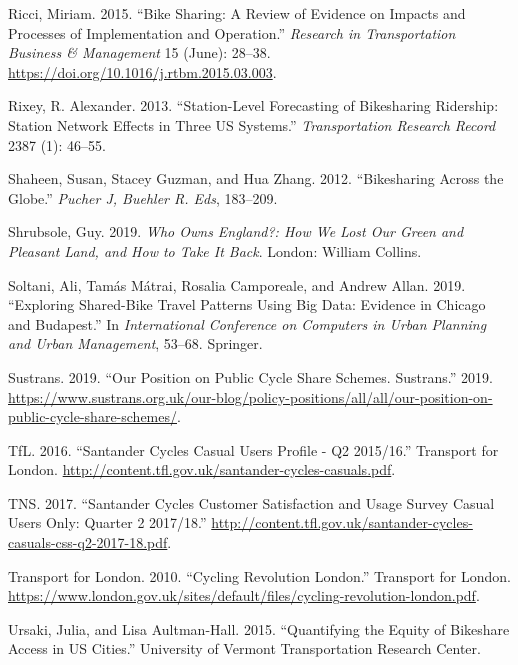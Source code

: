 \documentclass[
]{article}
\newlength{\cslhangindent}
\newenvironment{cslreferences}%
  {\setlength{\parindent}{0pt}%
  \everypar{\setlength{\hangindent}{\cslhangindent}}\ignorespaces}%
  {\par}
\begin{document}
\begin{cslreferences}
\leavevmode\hypertarget{ref-ricci_bike_2015}{}%
Ricci, Miriam. 2015. ``Bike Sharing: A Review of Evidence on Impacts and Processes of Implementation and Operation.'' \emph{Research in Transportation Business \& Management} 15 (June): 28--38. \url{https://doi.org/10.1016/j.rtbm.2015.03.003}.

\leavevmode\hypertarget{ref-rixey_station-level_2013}{}%
Rixey, R. Alexander. 2013. ``Station-Level Forecasting of Bikesharing Ridership: Station Network Effects in Three US Systems.'' \emph{Transportation Research Record} 2387 (1): 46--55.

\leavevmode\hypertarget{ref-shaheen_bikesharing_2012}{}%
Shaheen, Susan, Stacey Guzman, and Hua Zhang. 2012. ``Bikesharing Across the Globe.'' \emph{Pucher J, Buehler R. Eds}, 183--209.

\leavevmode\hypertarget{ref-shrubsole_who_2019}{}%
Shrubsole, Guy. 2019. \emph{Who Owns England?: How We Lost Our Green and Pleasant Land, and How to Take It Back}. London: William Collins.

\leavevmode\hypertarget{ref-soltani_exploring_2019}{}%
Soltani, Ali, Tamás Mátrai, Rosalia Camporeale, and Andrew Allan. 2019. ``Exploring Shared-Bike Travel Patterns Using Big Data: Evidence in Chicago and Budapest.'' In \emph{International Conference on Computers in Urban Planning and Urban Management}, 53--68. Springer.

\leavevmode\hypertarget{ref-sustrans_our_2019}{}%
Sustrans. 2019. ``Our Position on Public Cycle Share Schemes. Sustrans.'' 2019. \url{https://www.sustrans.org.uk/our-blog/policy-positions/all/all/our-position-on-public-cycle-share-schemes/}.

\leavevmode\hypertarget{ref-tfl_santander_2016}{}%
TfL. 2016. ``Santander Cycles Casual Users Profile - Q2 2015/16.'' Transport for London. \url{http://content.tfl.gov.uk/santander-cycles-casuals.pdf}.

\leavevmode\hypertarget{ref-tns_santander_2017}{}%
TNS. 2017. ``Santander Cycles Customer Satisfaction and Usage Survey Casual Users Only: Quarter 2 2017/18.'' \url{http://content.tfl.gov.uk/santander-cycles-casuals-css-q2-2017-18.pdf}.

\leavevmode\hypertarget{ref-transport_for_london_cycling_2010}{}%
Transport for London. 2010. ``Cycling Revolution London.'' Transport for London. \url{https://www.london.gov.uk/sites/default/files/cycling-revolution-london.pdf}.

\leavevmode\hypertarget{ref-ursaki_quantifying_2015}{}%
Ursaki, Julia, and Lisa Aultman-Hall. 2015. ``Quantifying the Equity of Bikeshare Access in US Cities.'' University of Vermont Transportation Research Center.


\end{cslreferences}
\end{document}
